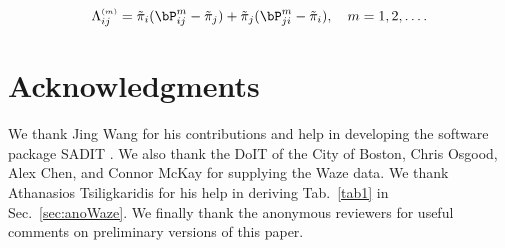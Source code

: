 \documentclass[10pt, twocolumn]{IEEEtran}
\begin{document}
\[
\Lambda ^{\scriptscriptstyle{(m)}}_{ij} = {{\tilde \pi }_i}(
{{\bP}_{ij}^m - {{\tilde \pi }_j}} ) + {{\tilde \pi }_j} ( {{\bP}_{ji}^m
  - {{\tilde \pi }_i}} ),\quad m = 1,2, \ldots. 
\]


\section*{Acknowledgments}

We thank Jing Wang for his contributions and help in developing the
software package SADIT \cite{SADIT}. We also thank the DoIT of the City
of Boston, Chris Osgood, Alex Chen, and Connor McKay for supplying the
Waze data. We thank Athanasios Tsiligkaridis for his help in deriving
Tab.~\ref{tab1} in Sec.~\ref{sec:anoWaze}. We finally thank the
anonymous reviewers for useful comments on preliminary versions of this
paper.
\end{document}

